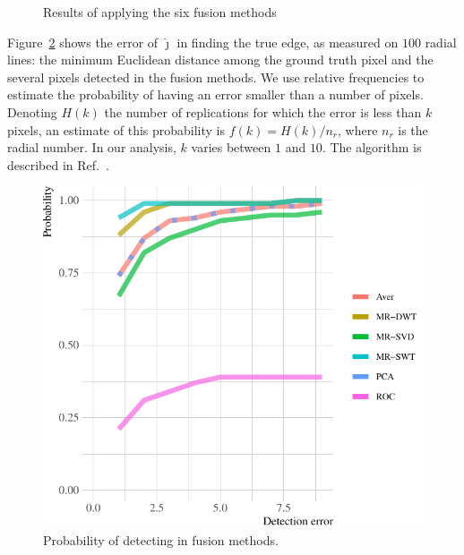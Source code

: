 \documentclass[journal]{IEEEtran}
\begin{document}
\begin{figure}[hbt]
{     }
     \caption{Results of applying the six fusion methods}
     \label{fusion_met}
\end{figure}

Figure~\ref{probability_edge_detc} shows the error of $\widehat\jmath$ in finding the true edge, as measured on $100$ radial lines: the minimum Euclidean distance among the ground truth pixel and the several pixels detected in the fusion methods.
We use relative frequencies to estimate the probability of having an error smaller than a number of pixels. 
Denoting $H(k)$ the number of replications for which the error is less than $k$ pixels, an estimate of this probability is $f(k)={H(k)}/{n_r}$, where $n_r$ is the radial number. 
In our analysis, $k$ varies between $1$ and $10$. 
The algorithm is described in Ref.~\cite{fbgm}.

\begin{figure}[hbt]
\centering
	\includegraphics[width=.8\linewidth]{metricas_6_fusao_flevoland}
	\caption{Probability of detecting in fusion methods.}
\label{probability_edge_detc}
\end{figure}
\end{document}
